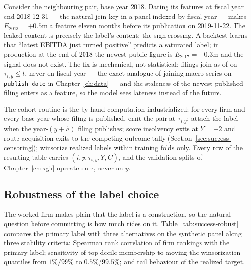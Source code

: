 \begin{warning}
\label{warn:success-unpublished}
Consider the neighbouring pair, base year 2018. Dating its features at fiscal year
end 2018-12-31 --- the natural join key in a panel indexed by fiscal year --- makes
$E_{2018} = +0.5$m a feature eleven months before its publication on 2019-11-22. The
leaked content is precisely the label's content: the sign crossing. A backtest learns
that ``latest EBITDA just turned positive'' predicts a saturated label; in production
at the end of 2018 the newest public figure is $E_{2017} = -0.3$m and the signal does
not exist. The fix is mechanical, not statistical: filings join as-of on
$\tau_{i,y} \le t$, never on fiscal year --- the exact analogue of joining macro
series on \texttt{publish\_date} in Chapter~\ref{ch:data} --- and the staleness of
the newest published filing enters as a feature, so the model sees lateness instead
of the future.
\end{warning}

The cohort routine is the by-hand computation industrialized: for every firm and
every base year whose filing is published, emit the pair at $\tau_{i,y}$; attach the
label when the year-$(y{+}h)$ filing publishes; score insolvency exits at $Y = -2$
and route acquisition exits to the competing-outcome tally
(Section~\ref{sec:success-censoring}); winsorize realized labels within training
folds only. Every row of the resulting table carries $(i, y, \tau_{i,y}, Y, C)$, and
the validation splits of Chapter~\ref{ch:xgb} operate on $\tau$, never on $y$.

\subsection{Robustness of the label choice}
\label{sec:success-robust}

The worked firm makes plain that the label is a construction, so the natural question
before committing is how much rides on it. Table~\ref{tab:success-robust} compares
the primary label with three alternatives on the synthetic panel along three
stability criteria: Spearman rank correlation of firm rankings with the primary
label; sensitivity of top-decile membership to moving the winsorization quantiles
from $1\%/99\%$ to $0.5\%/99.5\%$; and tail behaviour of the realized target.

